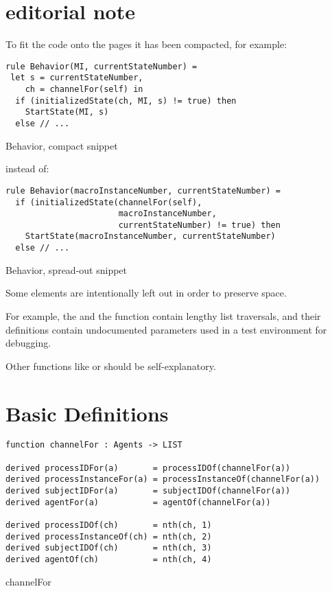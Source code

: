 \section{editorial note}

To fit the code onto the pages it has been compacted, for example:

\begin{listing}[H]
\begin{verbatim}
rule Behavior(MI, currentStateNumber) =
 let s = currentStateNumber,
    ch = channelFor(self) in
  if (initializedState(ch, MI, s) != true) then
    StartState(MI, s)
  else // ...
\end{verbatim}
\caption{Behavior, compact snippet}
\label{lst:asm:Behavior_snipped_compact}
\end{listing}

instead of:

\begin{listing}[H]
\begin{verbatim}
rule Behavior(macroInstanceNumber, currentStateNumber) =
  if (initializedState(channelFor(self),
                       macroInstanceNumber,
                       currentStateNumber) != true) then
    StartState(macroInstanceNumber, currentStateNumber)
  else // ...
\end{verbatim}
\caption{Behavior, spread-out snippet}
\label{lst:asm:Behavior_snipped_spread-out}
\end{listing}


Some elements are intentionally left out in order to preserve space.

For example, the  and
the   function
contain lengthy list traversals, and their definitions contain
undocumented parameters used in a test environment for debugging.

Other functions like  or  should be self-explanatory.




\newpage
\section{Basic Definitions}

\begin{listing}[H]
\begin{verbatim}
function channelFor : Agents -> LIST

derived processIDFor(a)       = processIDOf(channelFor(a))
derived processInstanceFor(a) = processInstanceOf(channelFor(a))
derived subjectIDFor(a)       = subjectIDOf(channelFor(a))
derived agentFor(a)           = agentOf(channelFor(a))

derived processIDOf(ch)       = nth(ch, 1)
derived processInstanceOf(ch) = nth(ch, 2)
derived subjectIDOf(ch)       = nth(ch, 3)
derived agentOf(ch)           = nth(ch, 4)
\end{verbatim}
\caption{channelFor}
\label{lst:asm:channelFor}
\end{listing}


